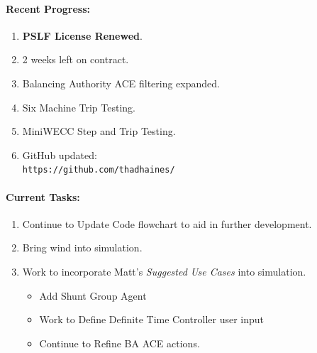 \documentclass[12pt]{article}
\begin{document}
\begin{multicols}{2}
\raggedright
	\paragraph{Recent Progress:}
	\begin{enumerate}

		\item \textbf{PSLF License Renewed}.
		\item 2 weeks left on contract.
		\item Balancing Authority ACE filtering expanded.
		\item Six Machine Trip Testing.
		\item MiniWECC Step and Trip Testing.
		


		\item GitHub updated:\\
		\verb|https://github.com/thadhaines/|
		
	\end{enumerate}
\paragraph{Current Tasks:}
	\begin{enumerate}

		\item Continue to Update Code flowchart to aid in further development.
		\item Bring wind into simulation.
		\item Work to incorporate Matt's \emph{Suggested Use Cases} into simulation.
		\begin{itemize}
		
		\item Add Shunt Group Agent
		\item Work to Define Definite Time Controller user input
		
		\item Continue to Refine BA ACE actions.

		\end{itemize}
		

	\end{enumerate}


\end{multicols}
\end{document}
